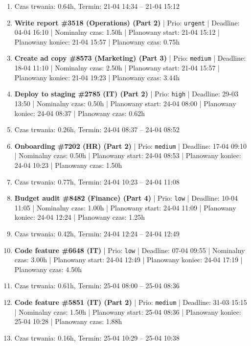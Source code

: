 {\begin{enumerate}
  \item [\textbf{PRZERWA}] Czas trwania: 0.64h, Termin: 21-04 14:34 -- 21-04 15:12
  \item [\textbf{14598}] \textbf{Write report \#3518 (Operations) (Part 2)} | Prio: \texttt{urgent} | Deadline: 04-04 16:10 | Nominalny czas: 1.50h | Planowany start: 21-04 15:12 | Planowany koniec: 21-04 15:57 | Planowany czas: 0.75h
  \item [\textbf{14677}] \textbf{Create ad copy \#8573 (Marketing) (Part 3)} | Prio: \texttt{medium} | Deadline: 18-04 11:10 | Nominalny czas: 2.50h | Planowany start: 21-04 15:57 | Planowany koniec: 21-04 19:23 | Planowany czas: 3.44h
  \item [\textbf{14623}] \textbf{Deploy to staging \#2785 (IT) (Part 2)} | Prio: \texttt{high} | Deadline: 29-03 13:50 | Nominalny czas: 0.50h | Planowany start: 24-04 08:00 | Planowany koniec: 24-04 08:37 | Planowany czas: 0.62h
  \item [\textbf{PRZERWA}] Czas trwania: 0.26h, Termin: 24-04 08:37 -- 24-04 08:52
  \item [\textbf{14648}] \textbf{Onboarding \#7202 (HR) (Part 2)} | Prio: \texttt{medium} | Deadline: 17-04 09:10 | Nominalny czas: 0.50h | Planowany start: 24-04 08:53 | Planowany koniec: 24-04 10:23 | Planowany czas: 1.50h
  \item [\textbf{PRZERWA}] Czas trwania: 0.77h, Termin: 24-04 10:23 -- 24-04 11:08
  \item [\textbf{14694}] \textbf{Budget audit \#8482 (Finance) (Part 4)} | Prio: \texttt{low} | Deadline: 10-04 11:05 | Nominalny czas: 1.00h | Planowany start: 24-04 11:09 | Planowany koniec: 24-04 12:24 | Planowany czas: 1.25h
  \item [\textbf{PRZERWA}] Czas trwania: 0.42h, Termin: 24-04 12:24 -- 24-04 12:49
  \item [\textbf{14683}] \textbf{Code feature \#6648 (IT)} | Prio: \texttt{low} | Deadline: 07-04 09:55 | Nominalny czas: 3.00h | Planowany start: 24-04 12:49 | Planowany koniec: 24-04 17:19 | Planowany czas: 4.50h
  \item [\textbf{PRZERWA}] Czas trwania: 0.61h, Termin: 25-04 08:00 -- 25-04 08:36
  \item [\textbf{14643}] \textbf{Code feature \#5851 (IT) (Part 2)} | Prio: \texttt{medium} | Deadline: 31-03 15:15 | Nominalny czas: 1.50h | Planowany start: 25-04 08:36 | Planowany koniec: 25-04 10:28 | Planowany czas: 1.88h
  \item [\textbf{PRZERWA}] Czas trwania: 0.16h, Termin: 25-04 10:29 -- 25-04 10:38

\end{enumerate}}
